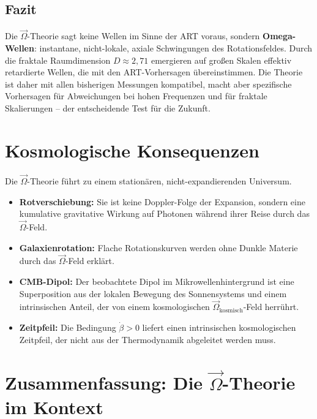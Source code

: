 \documentclass[12pt,a4paper]{article}
\begin{document}
\subsection{Fazit}

Die $\vec{\Omega}$-Theorie sagt keine Wellen im Sinne der ART voraus, sondern \textbf{Omega-Wellen}: instantane, nicht-lokale, axiale Schwingungen des Rotationsfeldes. Durch die fraktale Raumdimension $D \approx 2,71$ emergieren auf großen Skalen effektiv retardierte Wellen, die mit den ART-Vorhersagen übereinstimmen. Die Theorie ist daher mit allen bisherigen Messungen kompatibel, macht aber spezifische Vorhersagen für Abweichungen bei hohen Frequenzen und für fraktale Skalierungen – der entscheidende Test für die Zukunft.

\section{Kosmologische Konsequenzen}

Die $\vec{\Omega}$-Theorie führt zu einem stationären, nicht-expandierenden Universum.
\begin{itemize}
    \item \textbf{Rotverschiebung:} Sie ist keine Doppler-Folge der Expansion, sondern eine kumulative gravitative Wirkung auf Photonen während ihrer Reise durch das $\vec{\Omega}$-Feld.
    \item \textbf{Galaxienrotation:} Flache Rotationskurven werden ohne Dunkle Materie durch das $\vec{\Omega}$-Feld erklärt.
    \item \textbf{CMB-Dipol:} Der beobachtete Dipol im Mikrowellenhintergrund ist eine Superposition aus der lokalen Bewegung des Sonnensystems und einem intrinsischen Anteil, der von einem kosmologischen $\vec{\Omega}_{\text{kosmisch}}$-Feld herrührt.
    \item \textbf{Zeitpfeil:} Die Bedingung $\dot{\beta} > 0$ liefert einen intrinsischen kosmologischen Zeitpfeil, der nicht aus der Thermodynamik abgeleitet werden muss.
\end{itemize}

\section{Zusammenfassung: Die $\vec{\Omega}$-Theorie im Kontext}
\end{document}

